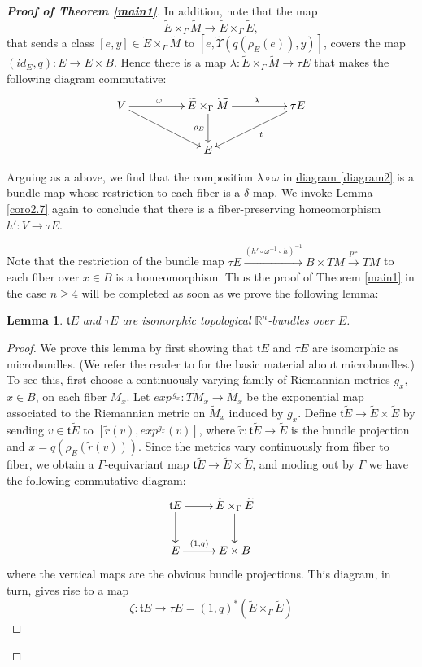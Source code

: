 \documentclass[onecolumn,notitlepage,11pt]{article}
\newcommand{\refer}[1]{\hyperref[#1]{\ref*{#1}}}%
\newcommand{\R}{\mathbb{R}}
\newcommand{\beq}{\begin{equation*}}
\newcommand{\eeq}{\end{equation*}}
\newtheorem{lemma}{Lemma}[section]
\theoremstyle{definition}
\begin{document}
\begin{proof}[\textbf{Proof of Theorem \refer{main1}}]
In addition, note that the map
\beq
\widetilde{E}\times_{\Gamma}\widetilde{M}\to
\widetilde{E}\times_{\Gamma}\widetilde{E},
\eeq 
that sends a class $[e,y]\in\widetilde{E}\times_{\Gamma}\widetilde{M}$
to $[e,\widetilde{\Upsilon}(q(\rho_E(e)),y)]$,
covers the map $(id_E,q):E\to E\times B$.
Hence there is a map 
$\lambda:\widetilde{E}\times_{\Gamma}\widetilde{M}\to\tau E$ that
makes the following diagram commutative:
\begin{equation}\label{diagram2}
\xymatrixcolsep{4pc}\xymatrix{
        V\ar[r]^{\omega\ \ \ }\ar[dr]    
     & \widetilde{E}\times_{\Gamma}\widetilde{M}\ar[d]_{\rho_E}     
     \ar[r]^{\ \ \ \lambda\ }      
     &\tau E\ar[dl]^{\ \ t}\\
     &E&
}
\end{equation}

Arguing as a above, we find that the composition 
$\lambda\circ\omega$ in
\hyperref[diagram2]{diagram \ref*{diagram2}} is a bundle map whose restriction
to each fiber is a $\delta$-map.
We invoke Lemma \ref{coro2.7} again to conclude that there is a fiber-preserving
homeomorphism $h':V\to\tau E$.

Note that the restriction of the bundle map 
$\tau E\xrightarrow{(h'\circ\omega^{-1}\circ h)^{-1}} B\times TM\xrightarrow{pr} TM$ to each fiber over $x\in B$ is 
a homeomorphism. Thus the proof of Theorem \ref{main1} in the
case $n\geq 4$ will be completed as soon as
we prove the following lemma:
\begin{lemma}\label{isoasbundles}
$\mathfrak{t}E$ and $\tau E$ are isomorphic topological 
$\R^n$-bundles over $E$.
\end{lemma}
\begin{proof}
We prove this lemma by first showing that $\mathfrak{t}E$ and $\tau E$
are isomorphic as microbundles. (We refer the reader to
\cite{micromilnor} for the basic
material about microbundles.) To see this, first choose 
a continuously varying family of Riemannian
metrics $g_x$, $x\in B$, on each fiber $M_x$. 
Let
$exp^{\, g_x}:T\widetilde{M}_x\to\widetilde{M_x}$ 
be the exponential map associated to the Riemannian metric on
$\widetilde{M}_x$ induced by $g_x$. 
Define $\mathfrak{t}\widetilde{E}\to\widetilde{E}\times\widetilde{E}$
by sending $v\in \mathfrak{t}\widetilde{E}$ to 
$[\widetilde{r}(v),exp^{g_x}(v)]$, where 
$\widetilde{r}:\mathfrak{t}\widetilde{E}\to\widetilde{E}$ is the
bundle projection and $x=q(\rho_E(\widetilde{r}(v)))$.
Since the 
metrics vary continuously from fiber to fiber, we obtain a
$\Gamma$-equivariant map 
$\mathfrak{t}\widetilde{E}\to\widetilde{E}\times\widetilde{E}$,
and moding out by $\Gamma$ we have
the following commutative diagram:
\beq
\xymatrix{
\mathfrak{t}E\ar[r]\ar[d] & \widetilde{E}\times_{\Gamma}\widetilde{E}\ar[d]\\
 E\ar[r]^-{(1,q)} & E\times B
}
\eeq
where the vertical maps are the obvious bundle projections.
This diagram, in turn,  gives rise to a map
\beq
\zeta:\mathfrak{t}E\to\tau E=(1,q)^*(\widetilde{E}\times_{\Gamma}\widetilde{E})
\eeq


\end{proof}
\end{proof}
\end{document}
